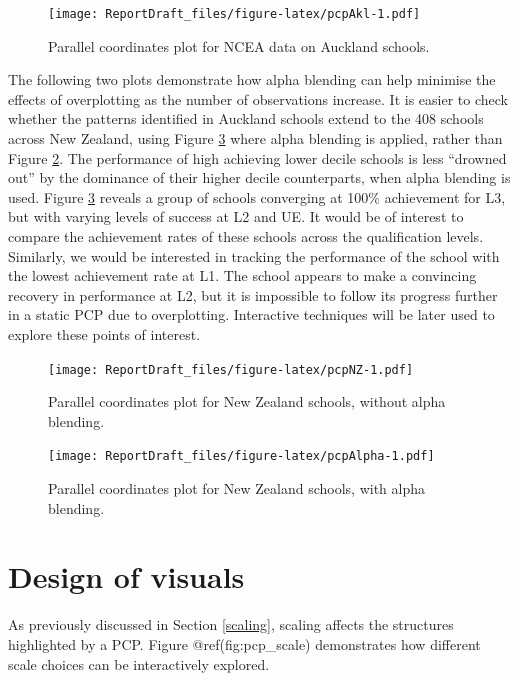 \documentclass[]{book}
\theoremstyle{definition}
\theoremstyle{definition}
\theoremstyle{definition}
\theoremstyle{remark}
\begin{document}
\begin{figure}[htbp]
\centering
\texttt{[image: ReportDraft\_files/figure-latex/pcpAkl-1.pdf]}
\caption{\label{fig:pcpAkl}Parallel coordinates plot for NCEA data on
Auckland schools.}
\end{figure}

The following two plots demonstrate how alpha blending can help minimise
the effects of overplotting as the number of observations increase. It
is easier to check whether the patterns identified in Auckland schools
extend to the 408 schools across New Zealand, using Figure
\ref{fig:pcpAlpha} where alpha blending is applied, rather than Figure
\ref{fig:pcpNZ}. The performance of high achieving lower decile schools
is less ``drowned out'' by the dominance of their higher decile
counterparts, when alpha blending is used. Figure \ref{fig:pcpAlpha}
reveals a group of schools converging at 100\% achievement for L3, but
with varying levels of success at L2 and UE. It would be of interest to
compare the achievement rates of these schools across the qualification
levels. Similarly, we would be interested in tracking the performance of
the school with the lowest achievement rate at L1. The school appears to
make a convincing recovery in performance at L2, but it is impossible to
follow its progress further in a static PCP due to overplotting.
Interactive techniques will be later used to explore these points of
interest.

\begin{figure}[htbp]
\centering
\texttt{[image: ReportDraft\_files/figure-latex/pcpNZ-1.pdf]}
\caption{\label{fig:pcpNZ}Parallel coordinates plot for New Zealand schools,
without alpha blending.}
\end{figure}

\begin{figure}[htbp]
\centering
\texttt{[image: ReportDraft\_files/figure-latex/pcpAlpha-1.pdf]}
\caption{\label{fig:pcpAlpha}Parallel coordinates plot for New Zealand
schools, with alpha blending.}
\end{figure}

\section{Design of visuals}\label{design-of-visuals}

As previously discussed in Section \ref{scaling}, scaling affects the
structures highlighted by a PCP. Figure @ref(fig:pcp\_scale)
demonstrates how different scale choices can be interactively explored.
\end{document}

